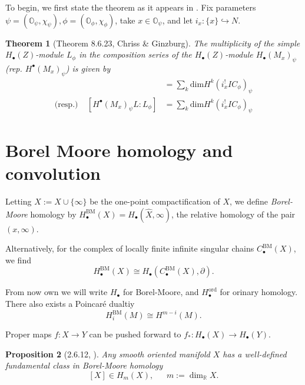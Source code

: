 \documentclass{memoir}
\newcommand{\mb}{\mathbb}
\newcommand{\di}{\partial}
\newcommand{\br}{\mathbb{R}}
\newcommand{\tx}{\text}
\newtheorem{theorem}{Theorem}[section]
\newtheorem{prop}[theorem]{Proposition}
\theoremstyle{definition}
\begin{document}
	To begin, we first state the theorem as it appears in \cite{Chr}.  
	Fix parameters $\psi=(\mb{O}_\psi, \chi_\psi), \phi=(\mb{O}_\phi, \chi_\phi)$, take $x\in\mb{O}_\psi$, and let $i_x:\{x\}\hookrightarrow N$.  
	
	\begin{theorem}[Theorem 8.6.23, Chriss \& Ginzburg]
		The multiplicity of the simple $H_\bullet(Z)$-module $L_\phi$ in the composition series of the $H_\bullet(Z)$-module $H_\bullet(M_x)_\psi$ (rep. $H^\bullet(M_x)_\psi$) is given by
		\begin{align*}
			[H_\bullet(M_x)_\psi L: L L_\phi]&=\sum_k\tx{dim}H^k(i_x^!IC_\phi)_\psi\\
			\tx{(resp.)} \ \ \ \ \ [H^\bullet(M_x)_\psi L : L_\phi]&=\sum_k\tx{dim}H^k(i_x^!IC_\phi)_\psi
		\end{align*}
	\end{theorem}













	\section{Borel Moore homology and convolution}
	
	Letting $\hat{X}:=X\cup\{\infty\}$ be the one-point compactification of $X$, we define \emph{Borel-Moore} homology by $H_\bullet^{\tx{BM}}(X)=H_\bullet(\hat{X}, \infty)$, the relative homology of the pair $(x, \infty)$.   
	
	Alternatively, for the complex of locally finite infinite singular chains $C_\bullet^{\tx{BM}}(X)$, we find 
	$$H_\bullet^{\tx{BM}}(X)\cong H_\bullet(C_\bullet^{\tx{BM}}(X), \di).$$
	
	From now own we will write $H_\bullet$ for Borel-Moore, and $H_\bullet^{\tx{ord}}$ for orinary homology. 
	There also exists a Poincar\'e dualtiy 
	$$H_i^{\tx{BM}}(M)\cong H^{m-i}(M).$$
	
	Proper maps $f:X\to Y$ can be pushed forward to $f_\ast:H_\bullet(X)\to H_\bullet(Y)$.  


	\begin{prop}[2.6.12, \cite{Chr}]
		Any smooth oriented manifold $X$ has a well-defined \emph{fundamental class} in Borel-Moore homology
		$$[X]\in H_m(X), \ \ \ \ \ \ \ m:=\dim_\br X.$$
	\end{prop}
\end{document}
